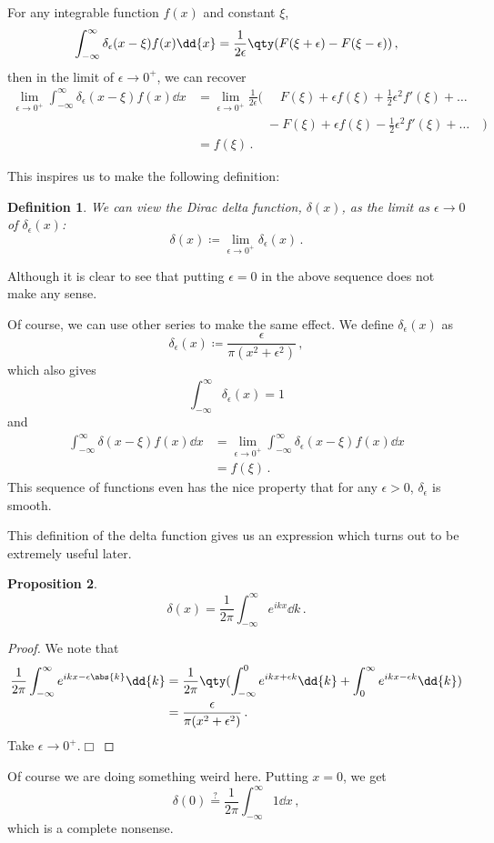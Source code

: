 \documentclass{article}
\theoremstyle{plain}\theoremheaderfont{\normalfont\itshape}\theorembodyfont{\rmfamily}\theoremseparator{.}\newtheorem*{rem}{Remark}\newtheorem*{ex}{Example}\newtheorem*{proof}{Proof}\newtheorem*{altp}{Alternative proof}
\theoremstyle{plain}\theoremheaderfont{\normalfont\bfseries}\theorembodyfont{\rmfamily}\theoremseparator{.}\newtheorem{thm}{Theorem}[section]\newtheorem{lem}[thm]{Lemma}\newtheorem{prop}[thm]{Proposition}\newtheorem*{cor}{Corollary}\newtheorem{defn}[thm]{Definition}\newtheorem{clm}[thm]{Claim}\newtheorem{clminproof}{Claim}
\theoremstyle{break}\theoremheaderfont{\normalfont\itshape}\theorembodyfont{\rmfamily}\theoremseparator{.\medskip}\newtheorem*{proofskip}{Proof}\newtheorem*{exs}{Examples}\newtheorem*{rems}{Remarks}
\theoremstyle{break}\theoremheaderfont{\normalfont\bfseries}\theorembodyfont{\rmfamily}\theoremseparator{.\medskip}\newtheorem{lemskip}[thm]{Lemma}\newtheorem{defnskip}[thm]{Definition}\newtheorem{propskip}[thm]{Proposition}\newtheorem{thmskip}[thm]{Theorem}
\numberwithin{equation}{section}
\newcommand{\qed}{\hfill\ensuremath{\Box}}
\begin{document}
	For any integrable function \(f(x)\) and constant \(\xi\),
	\[\int_{-\infty}^{\infty}\delta_\epsilon(x-\xi)f(x)\dd{x}=\frac{1}{2\epsilon}\qty(F(\xi+\epsilon)-F(\xi-\epsilon))\,,\]
	then in the limit of \(\epsilon\to 0^+\), we can recover
	\begin{align*}
		\lim_{\epsilon\to 0^+}\int_{-\infty}^{\infty}\delta_\epsilon(x-\xi)f(x)\dd{x}&=\lim_{\epsilon\to 0^+}\frac{1}{2\epsilon}\Big(\,\,\quad F(\xi)+\epsilon f(\xi)+\frac{1}{2}\epsilon^2 f'(\xi)+\dots\;&\\
		&\qquad\quad\qquad\,\,\,-F(\xi)+\epsilon f(\xi)-\frac{1}{2}\epsilon^2f'(\xi)+\dots\quad\Big)\\
		&=f(\xi)\,.
	\end{align*}
	
	This inspires us to make the following definition:
	\begin{defn}
		We can view the \textit{Dirac delta function}, \(\delta(x)\), as the limit as \(\epsilon\to 0\) of \(\delta_\epsilon(x)\):
		\[\delta(x)\coloneqq\lim_{\epsilon\to 0^+}\delta_{\epsilon}(x)\,.\]
	\end{defn}
	Although it is clear to see that putting \(\epsilon=0\) in the above sequence does not make any sense.
	
	Of course, we can use other series to make the same effect. We define \(\delta_\epsilon(x)\) as
	\[\delta_\epsilon(x)\coloneqq\frac{\epsilon}{\pi(x^2+\epsilon^2)}\,,\]
	which also gives
	\[\int_{-\infty}^{\infty}\delta_\epsilon(x)=1\]
	and
	\begin{align*}
		\int_{-\infty}^{\infty}\delta(x-\xi)f(x)\dd{x}&=\lim_{\epsilon\to 0^+}\int_{-\infty}^{\infty}\delta_\epsilon(x-\xi)f(x)\dd{x}\\
		&=f(\xi)\,.
	\end{align*}
	This sequence of functions even has the nice property that for any \(\epsilon>0\), \(\delta_\epsilon\) is smooth.
	
	This definition of the delta function gives us an expression which turns out to be extremely useful later.
	\begin{prop}
		\[\delta(x)=\frac{1}{2\pi}\int_{-\infty}^{\infty}e^{ikx}\dd{k}\,.\]
	\end{prop}
	\begin{proof}
		We note that
		\begin{align*}
			\frac{1}{2\pi}\int_{-\infty}^{\infty}e^{ikx-\epsilon\abs{k}}\dd{k}&=\frac{1}{2\pi}\qty(\int_{-\infty}^{0}e^{ikx+\epsilon k}\dd{k}+\int_{0}^{\infty}e^{ikx-\epsilon k}\dd{k})\\
			&=\frac{\epsilon}{\pi(x^2+\epsilon^2)}\,.
		\end{align*}
		Take \(\epsilon\to 0^+\).\qed
	\end{proof}
	Of course we are doing something weird here. Putting \(x=0\), we get
	\[\delta(0)\stackrel{?}{=}\frac{1}{2\pi}\int_{-\infty}^{\infty}1\dd{x}\,,\]
	which is a complete nonsense. 
	
\end{document}
